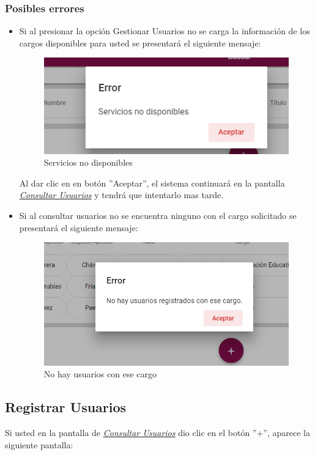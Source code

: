   \subsubsection{Posibles errores}
  \begin{itemize}
  	\item Si al  presionar la opción Gestionar Usuarios no se carga la información de los cargos disponibles para usted se presentará el siguiente mensaje:

  	\begin{figure}[H]
  		\centering
  		\includegraphics[width=0.4\linewidth]{images/SP5/MSGSN}
  		\caption{Servicios no disponibles}
  		\label{SND}

  	\end{figure}

  	Al dar clic en en botón ''Aceptar'', el sistema continuará en la pantalla  \hyperlink{consultarUs}{\textit{Consultar Usuarios}} y tendrá que intentarlo  mas tarde.

  	\item Si al consultar usuarios no se encuentra ninguno con el cargo solicitado se presentará el siguiente mensaje:
  	\begin{figure}[H]
  		\centering
  		\includegraphics[width=0.4\linewidth]{images/SP5/MSG21}
  		\caption{No hay usuarios con ese cargo}
  		\label{mensaje21}
  	\end{figure}

  \end{itemize}



  \newpage
  \hypertarget{registrarUs}{}
  \subsection{Registrar Usuarios}
  Si usted  en la pantalla de \hyperlink{consultarUs}{\textit{Consultar Usuarios}} dio clic en el botón ''+'', aparece la siguiente pantalla:

